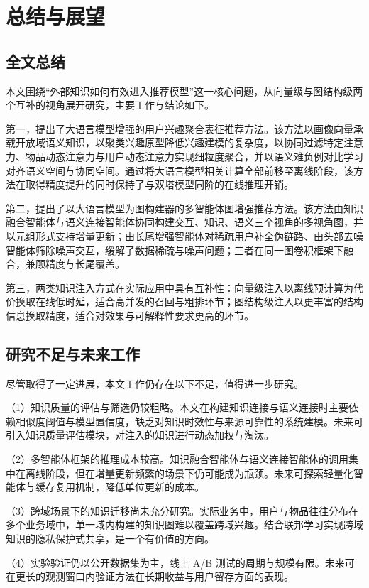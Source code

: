 
\chapter{总结与展望}
\label{cha:conclusion}

\section{全文总结}
\label{sec:conclusion-summary}

本文围绕“外部知识如何有效进入推荐模型”这一核心问题，从向量级与图结构级两个互补的视角展开研究，主要工作与结论如下。

第一，提出了大语言模型增强的用户兴趣聚合表征推荐方法。该方法以画像向量承载开放域语义知识，以聚类兴趣原型降低兴趣建模的复杂度，以协同过滤特定注意力、物品动态注意力与用户动态注意力实现细粒度聚合，并以语义难负例对比学习对齐语义空间与协同空间。通过将大语言模型相关计算全部前移至离线阶段，该方法在取得精度提升的同时保持了与双塔模型同阶的在线推理开销。

第二，提出了以大语言模型为图构建器的多智能体图增强推荐方法。该方法由知识融合智能体与语义连接智能体协同构建交互、知识、语义三个视角的多视角图，并以元组形式支持增量更新；由长尾增强智能体对稀疏用户补全伪链路、由头部去噪智能体筛除噪声交互，缓解了数据稀疏与噪声问题；三者在同一图卷积框架下融合，兼顾精度与长尾覆盖。

第三，两类知识注入方式在实际应用中具有互补性：向量级注入以离线预计算为代价换取在线低时延，适合高并发的召回与粗排环节；图结构级注入以更丰富的结构信息换取精度，适合对效果与可解释性要求更高的环节。

\section{研究不足与未来工作}
\label{sec:future-work}

尽管取得了一定进展，本文工作仍存在以下不足，值得进一步研究。

（1）知识质量的评估与筛选仍较粗略。本文在构建知识连接与语义连接时主要依赖相似度阈值与模型置信度，缺乏对知识时效性与来源可靠性的系统建模。未来可引入知识质量评估模块，对注入的知识进行动态加权与淘汰。

（2）多智能体框架的推理成本较高。知识融合智能体与语义连接智能体的调用集中在离线阶段，但在增量更新频繁的场景下仍可能成为瓶颈。未来可探索轻量化智能体与缓存复用机制，降低单位更新的成本。

（3）跨域场景下的知识迁移尚未充分研究。实际业务中，用户与物品往往分布在多个业务域中，单一域内构建的知识图难以覆盖跨域兴趣。结合联邦学习实现跨域知识的隐私保护式共享，是一个有价值的方向。

（4）实验验证仍以公开数据集为主，线上 A/B 测试的周期与规模有限。未来可在更长的观测窗口内验证方法在长期收益与用户留存方面的表现。

